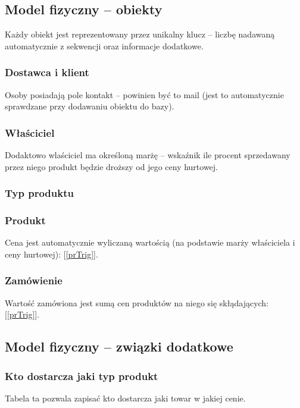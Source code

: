 \subsection{Model fizyczny -- obiekty}
Każdy obiekt jest reprezentowany przez unikalny klucz -- liczbę nadawaną automatycznie z sekwencji oraz informacje dodatkowe. \\
\subsubsection{Dostawca i klient}
Osoby posiadają pole kontakt -- powinien być to mail (jest to automatycznie sprawdzane przy dodawaniu obiektu do bazy).


\subsubsection{Właściciel}
Dodaktowo wlaściciel ma określoną marżę -- wskaźnik ile procent sprzedawany przez niego produkt będzie droższy od jego ceny hurtowej.

\subsubsection{Typ produktu}

\subsubsection{Produkt}
Cena jest automatycznie wyliczaną wartością (na podstawie marży właściciela i ceny hurtowej): [\ref{prTrig}].

\subsubsection{Zamówienie}
Wartość zamówiona jest sumą cen produktów na niego się skłądających: [\ref{prTrig}].

\subsection{Model fizyczny -- związki dodatkowe}
\subsubsection{Kto dostarcza jaki typ produkt}
Tabela ta pozwala zapisać kto dostarcza jaki towar w jakiej cenie.

